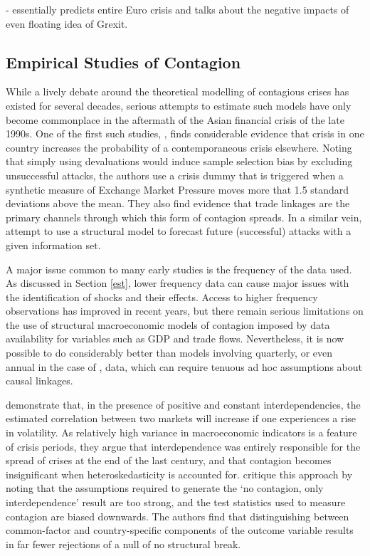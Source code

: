 \documentclass[../base.tex]{subfiles}
\begin{document}
\cite{obstfeld1997destabilizing} - essentially predicts entire Euro crisis and talks about the negative impacts of even floating idea of Grexit.

\subsection{Empirical Studies of Contagion}

While a lively debate around the theoretical modelling of contagious crises has existed for several decades, serious attempts to estimate such models have only become commonplace in the aftermath of the Asian financial crisis of the late 1990s. One of the first such studies, \cite{eichengreen1996contagious}, finds considerable evidence that crisis in one country increases the probability of a contemporaneous crisis elsewhere. Noting that simply using devaluations would induce sample selection bias by excluding unsuccessful attacks, the authors use a crisis dummy that is triggered when a synthetic measure of Exchange Market Pressure moves more that 1.5 standard deviations above the mean. They also find evidence that trade linkages are the primary channels through which this form of contagion spreads. In a similar vein, \cite{esquivel1998explaining} attempt to use a structural model to forecast future (successful) attacks with a given information set.

A major issue common to many early studies is the frequency of the data used. As discussed in Section \ref{est}, lower frequency data can cause major issues with the identification of shocks and their effects. Access to higher frequency observations has improved in recent years, but there remain serious limitations on the use of structural macroeconomic models of contagion imposed by data availability for variables such as GDP and trade flows. Nevertheless, it is now possible to do considerably better than models involving quarterly, or even annual in the case of \cite{esquivel1998explaining}, data, which can require tenuous ad hoc assumptions about causal linkages.

\cite{forbes2002no} demonstrate that, in the presence of positive and constant interdependencies, the estimated correlation between two markets will increase if one experiences a rise in volatility. As relatively high variance in macroeconomic indicators is a feature of crisis periods, they argue that interdependence was entirely responsible for the spread of crises at the end of the last century, and that contagion becomes insignificant when heteroskedasticity is accounted for. \cite{corsetti2005some} critique this approach by noting that the assumptions required to generate the `no contagion, only interdependence' result are too strong, and the test statistics used to measure contagion are biased downwards. The authors find that distinguishing between common-factor and country-specific components of the outcome variable results in far fewer rejections of a null of no structural break. 
\end{document}
